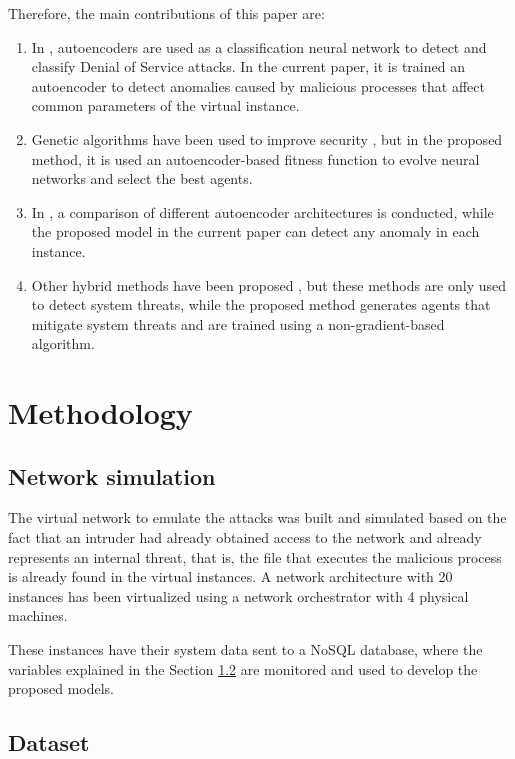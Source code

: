 \documentclass{iosart2c}
\begin{document}
Therefore, the main contributions of this paper are:
\begin{enumerate}
	\item In \cite{autoencoderdos}, autoencoders are used as a classification neural network to detect and classify Denial of Service attacks. In the current paper, it is trained an autoencoder to detect anomalies caused by malicious processes that affect common parameters of the virtual instance. 
	\item Genetic algorithms have been used to improve security \cite{GA1, GA2, GA3}, but in the proposed method, it is used an autoencoder-based fitness function to evolve neural networks and select the best agents.
	\item In \cite{autoencoder3}, a comparison of different autoencoder architectures is conducted, while the proposed model in the current paper can detect any anomaly in each instance.
	\item Other hybrid methods have been proposed \cite{hybrid1, hybrid2}, but these methods are only used to detect system threats, while the proposed method generates agents that mitigate system threats and are trained using a non-gradient-based algorithm.
\end{enumerate}

\section{Methodology}

\subsection{Network simulation}

The virtual network to emulate the attacks was built and simulated based on the fact that an intruder had already obtained access to the network and already represents an internal threat, that is, the file that executes the malicious process is already found in the virtual instances. A network architecture with 20 instances has been virtualized using a network orchestrator with 4 physical machines.

These instances have their system data sent to a NoSQL database, where the variables explained in the Section \ref{dataset_autoencoder} are monitored and used to develop the proposed models.


\subsection{Dataset}\label{dataset_autoencoder}
\end{document}
